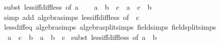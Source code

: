 \begin{isabellebody}
%
\isadelimproof
%
\endisadelimproof
%
\isatagproof
{}\isamarkupfalse%
\ {\isacharparenleft}{\kern0pt}subst\ less{\isacharunderscore}{\kern0pt}iff{\isacharunderscore}{\kern0pt}diff{\isacharunderscore}{\kern0pt}less{\isacharunderscore}{\kern0pt}{}\ {\isacharbrackleft}{\kern0pt}of\ a{\isacharbrackright}{\kern0pt}{\isacharparenright}{\kern0pt}\isanewline
\ \ \isamarkupfalse%
\ {\isachardoublequoteopen}{\isacharparenleft}{\kern0pt}a\ {\isacharminus}{\kern0pt}\ b\ {\isacharless}{\kern0pt}\ c{\isacharparenright}{\kern0pt}\ {\isacharequal}{\kern0pt}\ {\isacharparenleft}{\kern0pt}a\ {\isacharminus}{\kern0pt}\ {\isacharparenleft}{\kern0pt}c\ {\isacharplus}{\kern0pt}\ b{\isacharparenright}{\kern0pt}\ {\isacharless}{\kern0pt}\ {}{\isacharparenright}{\kern0pt}{\isachardoublequoteclose}\isanewline
\ \ \ \ \isamarkupfalse%
\ {\isacharparenleft}{\kern0pt}simp\ add{\isacharcolon}{\kern0pt}\ algebra{\isacharunderscore}{\kern0pt}simps\ less{\isacharunderscore}{\kern0pt}iff{\isacharunderscore}{\kern0pt}diff{\isacharunderscore}{\kern0pt}less{\isacharunderscore}{\kern0pt}{}\ {\isacharbrackleft}{\kern0pt}of\ {\isacharunderscore}{\kern0pt}\ c{\isacharbrackright}{\kern0pt}{\isacharparenright}{\kern0pt}\isanewline
{}\isamarkupfalse%
%
\endisatagproof
{\isafoldproof}%
%
\isadelimproof
\isanewline
%
\endisadelimproof
\isanewline
{}\isamarkupfalse%
\ less{\isacharunderscore}{\kern0pt}diff{\isacharunderscore}{\kern0pt}eq\ {\isacharbrackleft}{\kern0pt}algebra{\isacharunderscore}{\kern0pt}simps{\isacharcomma}{\kern0pt}\ algebra{\isacharunderscore}{\kern0pt}split{\isacharunderscore}{\kern0pt}simps{\isacharcomma}{\kern0pt}\ field{\isacharunderscore}{\kern0pt}simps{\isacharcomma}{\kern0pt}\ field{\isacharunderscore}{\kern0pt}split{\isacharunderscore}{\kern0pt}simps{\isacharbrackright}{\kern0pt}{\isacharcolon}{\kern0pt}\isanewline
\ \ {\isachardoublequoteopen}a\ {\isacharless}{\kern0pt}\ c\ {\isacharminus}{\kern0pt}\ b\ {\isasymlongleftrightarrow}\ a\ {\isacharplus}{\kern0pt}\ b\ {\isacharless}{\kern0pt}\ c{\isachardoublequoteclose}\isanewline
%
\isadelimproof
%
\endisadelimproof
%
\isatagproof
{}\isamarkupfalse%
\ {\isacharparenleft}{\kern0pt}subst\ less{\isacharunderscore}{\kern0pt}iff{\isacharunderscore}{\kern0pt}diff{\isacharunderscore}{\kern0pt}less{\isacharunderscore}{\kern0pt}{}\ {\isacharbrackleft}{\kern0pt}of\ {\isachardoublequoteopen}a\ {\isacharplus}{\kern0pt}\ b{\isachardoublequoteclose}{\isacharbrackright}{\kern0pt}{\isacharparenright}{\kern0pt}\isanewline

\end{isabellebody}
